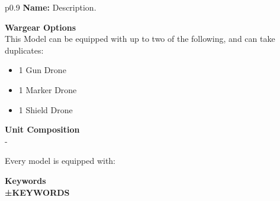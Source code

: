 \noindent\begin{tblr}{p{0.9\linewidth}}
\textbf{Name:} Description.\\
\hline[dotted]
\end{tblr}

\noindent\makebox[\linewidth]{\rule{\paperwidth}{0.4pt}}
{\bfseries \Large Wargear Options}\\

This Model can be equipped with up to two of the following, and can take duplicates:
\begin{itemize}
\item 1 Gun Drone
\item 1 Marker Drone
\item 1 Shield Drone
\end{itemize}

\noindent\makebox[\linewidth]{\rule{\paperwidth}{0.4pt}}
{\bfseries \Large Unit Composition}\\

\hspace{\parindent}- \textbf{}

\hspace{\parindent}Every model is equipped with: 

\noindent\makebox[\linewidth]{\rule{\paperwidth}{0.4pt}}
{\bfseries \Large Keywords}\\

\textbf{\uppercase{±KEYWORDS}}